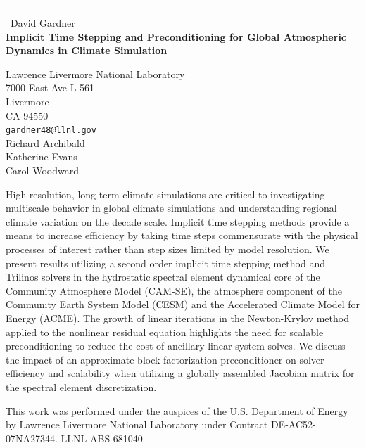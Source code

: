 \documentclass{report}
\begin{document}
\begin{center}
\rule{6in}{1pt} \
{\large David Gardner \\
{\bf Implicit Time Stepping and Preconditioning for Global Atmospheric Dynamics in Climate Simulation}}

Lawrence Livermore National Laboratory \\ 7000 East Ave L-561 \\ Livermore \\ CA 94550
\\
{\tt gardner48@llnl.gov}\\
Richard Archibald\\
Katherine Evans\\
Carol Woodward\end{center}

High resolution, long-term climate simulations are critical to
investigating multiscale behavior in global climate simulations and
understanding regional climate variation on the decade scale. Implicit
time stepping methods provide a means to increase efficiency by taking
time steps commensurate with the physical processes of interest rather
than step sizes limited by model resolution. We present results utilizing
a second order implicit time stepping method and Trilinos solvers in the
hydrostatic spectral element dynamical core of the Community Atmosphere
Model (CAM-SE), the atmosphere component of the Community Earth System
Model (CESM) and the Accelerated Climate Model for Energy (ACME). The
growth of linear iterations in the Newton-Krylov method applied to the
nonlinear residual equation highlights the need for scalable
preconditioning to reduce the cost of ancillary linear system solves. We
discuss the impact of an approximate block factorization preconditioner
on solver efficiency and scalability when utilizing a globally assembled
Jacobian matrix for the spectral element discretization.

This work was performed under the auspices of the U.S. Department of
Energy by Lawrence Livermore National Laboratory under Contract
DE-AC52-07NA27344. LLNL-ABS-681040
\end{document}
